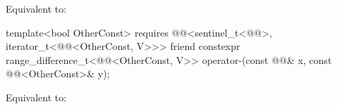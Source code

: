 \begin{itemdescr}
\pnum
\effects
Equivalent to: 
\end{itemdescr}

%
\begin{itemdecl}
template<bool OtherConst>
  requires @@<sentinel_t<@@>, iterator_t<@@<OtherConst, V>>>
friend constexpr range_difference_t<@@<OtherConst, V>>
  operator-(const @@& x, const @@<OtherConst>& y);
\end{itemdecl}

\begin{itemdescr}
\pnum
\effects
Equivalent to: 
\end{itemdescr}
